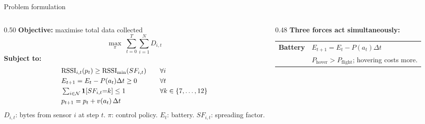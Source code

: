 \documentclass[aspectratio=169,11pt]{beamer}
\newcommand{\emp}[1]{{\color{manpurple}\textbf{#1}}}
\newcommand{\qt}[1]{{\color{muted}#1}}
\begin{document}
\begin{frame}{Problem formulation}
  \begin{columns}[T]
    \begin{column}{0.50\textwidth}
      \small
      \emp{Objective:} maximise total data collected
      \[
        \max_{\pi}\;\sum_{t=0}^{T}\sum_{i=1}^{N} D_{i,t}
      \]
      \vspace{-0.5em}
      \emp{Subject to:}
      \begin{alignat}{2}
        &\mathrm{RSSI}_{i,t}(p_t) \ge \mathrm{RSSI}_{\min}(SF_{i,t})
          &\quad&\forall i \notag\\
        &E_{t+1} = E_t - P(a_t)\Delta t \ge 0
          &\quad&\forall t \notag\\
        &\textstyle\sum_{i\in\mathcal{N}}\mathbf{1}[SF_{i,t}{=}k] \le 1
          &\quad&\forall k\in\{7,\ldots,12\} \notag\\
        &p_{t+1} = p_t + v(a_t)\,\Delta t \notag
      \end{alignat}
      \vspace{-0.3em}
      \footnotesize\qt{$D_{i,t}$: bytes from sensor $i$ at step $t$.
      $\pi$: control policy. $E_t$: battery. $SF_{i,t}$: spreading factor.}
    \end{column}
    \begin{column}{0.48\textwidth}
      \small\emp{Three forces act simultaneously:}\\[0.5em]
      \begin{tabular}{@{}p{2.2cm} p{3.8cm}@{}}
        \emp{Battery} &
          $E_{t+1}=E_t-P(a_t)\Delta t$\\
          & \tiny\qt{$P_\text{hover}>P_\text{flight}$; hovering costs more.}\\[0.4em]

\end{tabular}
\end{column}
\end{columns}
\end{frame}
\end{document}
